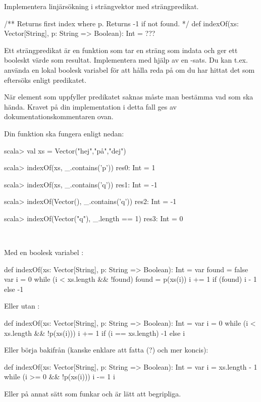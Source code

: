 \Subtask Implementera linjärsökning i strängvektor med strängpredikat.
\begin{Code}
/** Returns first index where p. Returns -1 if not found. */
def indexOf(xs: Vector[String], p: String => Boolean): Int = ???
\end{Code}
Ett strängpredikat  är en funktion som tar en sträng som indata och ger ett booleskt värde som resultat. Implementera  med hjälp av en -sats. Du kan t.ex. använda en lokal boolesk variabel  för att hålla reda på om du har hittat det som eftersöks enligt predikatet.

När element som uppfyller predikatet saknas måste man bestämma vad som ska hända. Kravet på din implementation i detta fall ges av dokumentationskommentaren ovan.

Din funktion ska fungera enligt nedan:
\begin{REPL}
scala> val xs = Vector("hej","på","dej")

scala> indexOf(xs, _.contains('p'))
res0: Int = 1

scala> indexOf(xs, _.contains('q'))
res1: Int = -1

scala> indexOf(Vector(), _.contains('q'))
res2: Int = -1

scala> indexOf(Vector("q"), _.length == 1)
res3: Int = 0
  \end{REPL}
\SOLUTION

\TaskSolved \what~

\SubtaskSolved

\begin{ConceptConnections}

\end{ConceptConnections}

\SubtaskSolved Med en boolesk variabel :

\begin{Code}
def indexOf(xs: Vector[String], p: String => Boolean): Int = {
  var found = false
  var i = 0
  while (i < xs.length && !found) {
      found = p(xs(i))
      i += 1
  }
  if (found) i - 1 else -1
}
\end{Code}
Eller utan :
\begin{Code}
def indexOf(xs: Vector[String], p: String => Boolean): Int = {
  var i = 0
  while (i < xs.length && !p(xs(i))) i += 1
  if (i == xs.length) -1 else i
}
\end{Code}
Eller börja bakifrån (kanske enklare att fatta (?) och mer koncis):
\begin{Code}
def indexOf(xs: Vector[String], p: String => Boolean): Int = {
  var i = xs.length - 1
  while (i >= 0 && !p(xs(i))) i -= 1
  i
}
\end{Code}
Eller på annat sätt som funkar och är lätt att begripliga.

